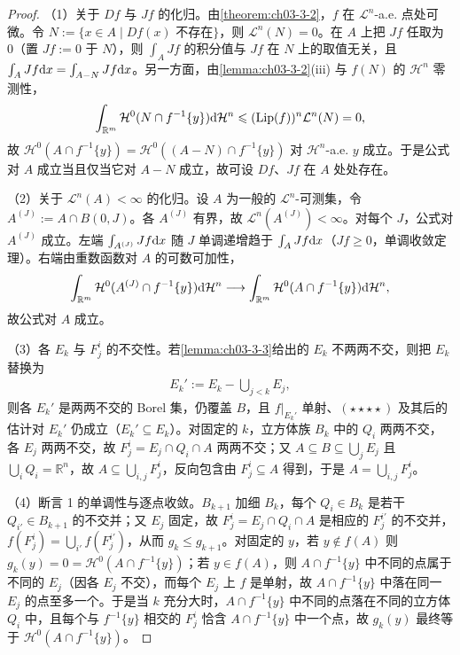 \documentclass[../../main.tex]{subfiles}%
\begin{document}
\begin{proof}
（1）关于 $Df$ 与 $Jf$ 的化归。由\cref{theorem:ch03-3-2}，$f$ 在 $\mathcal{L}^n$-a.e. 点处可微。令 $N:=\{x\in A\mid Df(x)\text{ 不存在}\}$，则 $\mathcal{L}^n(N)=0$。在 $A$ 上把 $Jf$ 任取为 $0$（置 $Jf:=0$ 于 $N$），则 $\int_AJf$ 的积分值与 $Jf$ 在 $N$ 上的取值无关，且 $\int_AJf\mathrm{d} x=\int_{A-N}Jf\mathrm{d} x$。另一方面，由\cref{lemma:ch03-3-2}(iii) 与 $f(N)$ 的 $\mathcal{H}^n$ 零测性， %
\begin{align*}
\int_{\mathbb{R}^m}\mathcal{H}^0(N\cap f^{-1}\{y\})\mathrm{d}\mathcal{H}^n\leqslant(\operatorname{Lip}(f))^n\mathcal{L}^n(N)=0,
\end{align*}
故 $\mathcal{H}^0(A\cap f^{-1}\{y\})=\mathcal{H}^0((A-N)\cap f^{-1}\{y\})$ 对 $\mathcal{H}^n$-a.e. $y$ 成立。于是公式对 $A$ 成立当且仅当它对 $A-N$ 成立，故可设 $Df$、$Jf$ 在 $A$ 处处存在。%

（2）关于 $\mathcal{L}^n(A)<\infty$ 的化归。设 $A$ 为一般的 $\mathcal{L}^n$-可测集，令 $A^{(J)}:=A\cap B(0,J)$。各 $A^{(J)}$ 有界，故 $\mathcal{L}^n(A^{(J)})<\infty$。对每个 $J$，公式对 $A^{(J)}$ 成立。左端 $\int_{A^{(J)}}Jf\mathrm{d} x$ 随 $J$ 单调递增趋于 $\int_AJf\mathrm{d} x$（$Jf\geqslant0$，单调收敛定理）。右端由重数函数对 $A$ 的可数可加性，
\begin{align*}
\int_{\mathbb{R}^m}\mathcal{H}^0(A^{(J)}\cap f^{-1}\{y\})\mathrm{d}\mathcal{H}^n
\longrightarrow\int_{\mathbb{R}^m}\mathcal{H}^0(A\cap f^{-1}\{y\})\mathrm{d}\mathcal{H}^n ,
\end{align*}
故公式对 $A$ 成立。

（3）各 $E_k$ 与 $F_j^i$ 的不交性。若\cref{lemma:ch03-3-3}给出的 $E_k$ 不两两不交，则把 $E_k$ 替换为%
\begin{align*}
E_k':=E_k-\bigcup_{j<k}E_j ,
\end{align*}
则各 $E_k'$ 是两两不交的 Borel 集，仍覆盖 $B$，且 $f|_{E_k'}$ 单射、$(\star\star\star\star)$ 及其后的估计对 $E_k'$ 仍成立（$E_k'\subseteq E_k$）。对固定的 $k$，立方体族 $B_k$ 中的 $Q_i$ 两两不交，各 $E_j$ 两两不交，故 $F_j^i=E_j\cap Q_i\cap A$ 两两不交；又 $A\subseteq B\subseteq\bigcup_jE_j$ 且 $\bigcup_iQ_i=\mathbb{R}^n$，故 $A\subseteq\bigcup_{i,j}F_j^i$，反向包含由 $F_j^i\subseteq A$ 得到，于是 $A=\bigcup_{i,j}F_j^i$。

（4）断言 1 的单调性与逐点收敛。$B_{k+1}$ 加细 $B_k$，每个 $Q_i\in B_k$ 是若干 $Q_{i'}\in B_{k+1}$ 的不交并；又 $E_j$ 固定，故 $F_j^{i}=E_j\cap Q_i\cap A$ 是相应的 $F_j^{i'}$ 的不交并，$f(F_j^i)=\bigcup_{i'}f(F_j^{i'})$，从而 $g_k\leqslant g_{k+1}$。对固定的 $y$，若 $y\notin f(A)$ 则 $g_k(y)=0=\mathcal{H}^0(A\cap f^{-1}\{y\})$；若 $y\in f(A)$，则 $A\cap f^{-1}\{y\}$ 中不同的点属于不同的 $E_j$（因各 $E_j$ 不交），而每个 $E_j$ 上 $f$ 是单射，故 $A\cap f^{-1}\{y\}$ 中落在同一 $E_j$ 的点至多一个。于是当 $k$ 充分大时，$A\cap f^{-1}\{y\}$ 中不同的点落在不同的立方体 $Q_i$ 中，且每个与 $f^{-1}\{y\}$ 相交的 $F_j^i$ 恰含 $A\cap f^{-1}\{y\}$ 中一个点，故 $g_k(y)$ 最终等于 $\mathcal{H}^0(A\cap f^{-1}\{y\})$。


\end{proof}
\end{document}
